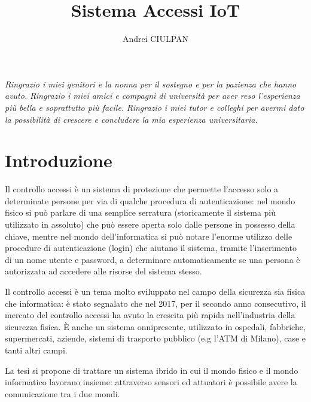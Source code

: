 \documentclass[12pt]{report}
\newcommand\blankpage{%
	\null
	\thispagestyle{empty}%
	\addtocounter{page}{-1}%
	\newpage}
\begin{document}
	

\title{Sistema Accessi IoT}
\author{Andrei CIULPAN}
\afterpage{\blankpage}
% 
%
\beforepreface

{\hfill \footnotesize {\sl Ringrazio i miei genitori e la nonna per il sostegno e per la pazienza che hanno avuto.}}
\vskip 0.8cm
{\hfill \footnotesize {\sl Ringrazio i miei amici e compagni di università per aver reso l'esperienza più bella e soprattutto più facile.}}
\vskip 0.8cm
{\hfill \footnotesize {\sl Ringrazio i miei tutor e colleghi per avermi dato la possibilità di crescere e concludere la mia esperienza universitaria.}}
\vskip 0.8cm
      

\afterpreface

\chapter{Introduzione}\label{cap:introduzione}
%

Il controllo accessi è un sistema di protezione che permette l'accesso solo a determinate persone per via di qualche procedura di autenticazione: nel mondo fisico si può parlare di una semplice serratura (storicamente il sistema più utilizzato in assoluto) che può essere aperta solo dalle persone in possesso della chiave, mentre nel mondo dell'informatica si può notare l'enorme utilizzo delle procedure di autenticazione (login) che aiutano il sistema, tramite l'inserimento di un nome utente e password, a determinare automaticamente se una persona è autorizzata ad accedere alle risorse del sistema stesso.

Il controllo accessi\cite{controllo_accessi} è un tema molto sviluppato nel campo della sicurezza sia fisica che informatica: è stato segnalato che nel 2017, per il secondo anno consecutivo, il mercato del controllo accessi ha avuto la crescita più rapida nell'industria della sicurezza fisica\cite{crescita_controllo_accessi}. È anche un sistema onnipresente, utilizzato in ospedali, fabbriche, supermercati, aziende, sistemi di trasporto pubblico (e.g l'ATM di Milano), case e tanti altri campi.  

La tesi si propone di trattare un sistema ibrido in cui il mondo fisico e il mondo informatico lavorano insieme: attraverso sensori ed attuatori è possibile avere la comunicazione tra i due mondi. 
\end{document}
